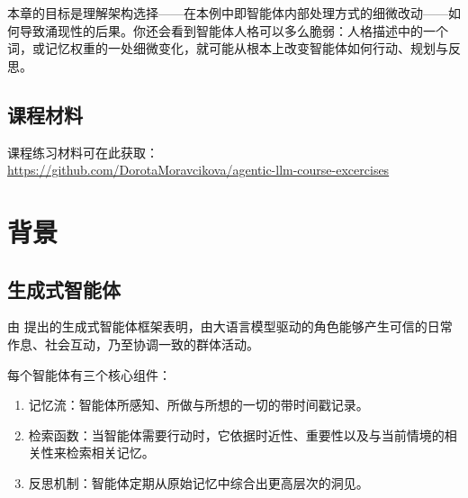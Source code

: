 本章的目标是理解架构选择——在本例中即智能体内部处理方式的细微改动——如何导致涌现性的后果。你还会看到智能体人格可以多么脆弱：人格描述中的一个词，或记忆权重的一处细微变化，就可能从根本上改变智能体如何行动、规划与反思。

\subsection*{课程材料}
课程练习材料可在此获取：\\
\url{https://github.com/DorotaMoravcikova/agentic-llm-course-excercises}

\section{背景}

\subsection{生成式智能体}

由 \citet{park2023generative} 提出的生成式智能体框架表明，由大语言模型驱动的角色能够产生可信的日常作息、社会互动，乃至协调一致的群体活动。

每个智能体有三个核心组件：
\begin{enumerate}
    \item 记忆流：智能体所感知、所做与所想的一切的带时间戳记录。
    \item 检索函数：当智能体需要行动时，它依据时近性、重要性以及与当前情境的相关性来检索相关记忆。
    \item 反思机制：智能体定期从原始记忆中综合出更高层次的洞见。
\end{enumerate}

